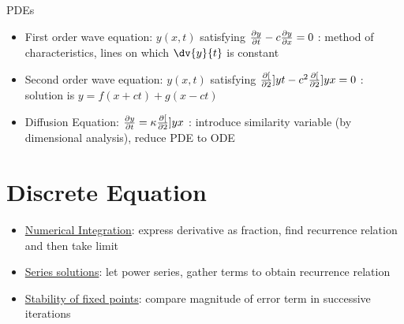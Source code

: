 PDEs
\begin{itemize}
    \item First order wave equation: $y(x,t)$ satisfying $\frac{\partial{y}}{\partial{t}} - c\frac{\partial{y}}{\partial{x}}=0$ : method of characteristics, lines on which $\dv{y}{t}$ is constant
    \item Second order wave equation: $y(x,t)$ satisfying $\frac{\partial{[}}{\partial{2}}]{y}{t} - c^2\frac{\partial{[}}{\partial{2}}]{y}{x}=0$ : solution is $y = f(x+ct) + g(x-ct) $
    \item Diffusion Equation: $\frac{\partial{y}}{\partial{t}} =\kappa \frac{\partial{[}}{\partial{2}}]{y}{x}$ : introduce similarity variable (by dimensional analysis), reduce PDE to ODE
\end{itemize}

\section{Discrete Equation}
\begin{itemize}
    \item \underline{Numerical Integration}: express derivative as fraction, find recurrence relation and then take limit
    \item \underline{Series solutions}: let power series, gather terms to obtain recurrence relation
    \item \underline{Stability of fixed points}: compare magnitude of error term in successive iterations
\end{itemize}
